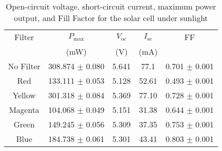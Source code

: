 \begin{table}[H]
    \centering
    \begin{tabular}{|c|c|c|c|c|}
    \hline
    Filter & $P_\text{max}$ & $V_\text{oc}$ & $I_\text{sc}$ & FF \\
     & (mW) & (V) & (mA) &  \\ \hline   
    No Filter & 308.874 $\pm$ 0.080 & 5.641 & 77.1 & 0.701 $\pm$ 0.001 \\ 
    Red & 133.111 $\pm$ 0.053 & 5.128 & 52.61 & 0.493 $\pm$ 0.001\\ 
    Yellow & 301.318 $\pm$ 0.084 & 5.369 & 77.10 & 0.728 $\pm$ 0.001\\ 
    Magenta & 104.068 $\pm$ 0.049 & 5.151 & 31.38 & 0.644 $\pm$ 0.001\\ 
    Green & 149.245 $\pm$ 0.056 & 5.309 & 37.35 & 0.753 $\pm$ 0.001\\ 
    Blue & 184.738 $\pm$ 0.061 & 5.301 & 43.41 & 0.803 $\pm$ 0.001\\ \hline
    \end{tabular}
    \caption{Open-circuit voltage, short-circuit current,
    maximum power output, and Fill Factor for the solar
    cell under sunlight}
    \label{out_all}
\end{table}